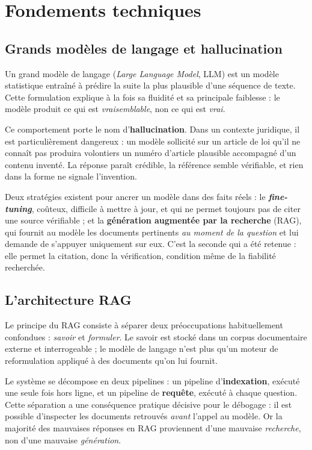 \section{Fondements techniques}

\subsection{Grands modèles de langage et hallucination}

Un grand modèle de langage (\textit{Large Language Model}, LLM) est un modèle statistique
entraîné à prédire la suite la plus plausible d'une séquence de texte. Cette formulation explique
à la fois sa fluidité et sa principale faiblesse : le modèle produit ce qui est
\emph{vraisemblable}, non ce qui est \emph{vrai}.

Ce comportement porte le nom d'\textbf{hallucination}. Dans un contexte juridique, il est
particulièrement dangereux : un modèle sollicité sur un article de loi qu'il ne connaît pas
produira volontiers un numéro d'article plausible accompagné d'un contenu inventé. La réponse
paraît crédible, la référence semble vérifiable, et rien dans la forme ne signale l'invention.

Deux stratégies existent pour ancrer un modèle dans des faits réels : le
\textbf{\textit{fine-tuning}}, coûteux, difficile à mettre à jour, et qui ne permet toujours pas
de citer une source vérifiable ; et la \textbf{génération augmentée par la recherche} (RAG), qui
fournit au modèle les documents pertinents \emph{au moment de la question} et lui demande de
s'appuyer uniquement sur eux. C'est la seconde qui a été retenue : elle permet la citation, donc
la vérification, condition même de la fiabilité recherchée.

\subsection{L'architecture RAG}

Le principe du RAG consiste à séparer deux préoccupations habituellement confondues :
\emph{savoir} et \emph{formuler}. Le savoir est stocké dans un corpus documentaire externe et
interrogeable ; le modèle de langage n'est plus qu'un moteur de reformulation appliqué à des
documents qu'on lui fournit.

Le système se décompose en deux pipelines : un pipeline d'\textbf{indexation}, exécuté une seule
fois hors ligne, et un pipeline de \textbf{requête}, exécuté à chaque question. Cette séparation
a une conséquence pratique décisive pour le débogage : il est possible d'inspecter les documents
retrouvés \emph{avant} l'appel au modèle. Or la majorité des mauvaises réponses en RAG
proviennent d'une mauvaise \emph{recherche}, non d'une mauvaise \emph{génération}.

